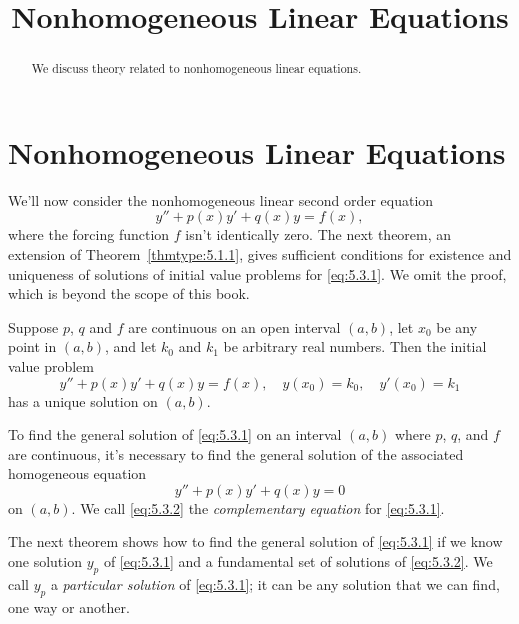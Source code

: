 \documentclass{ximera}
\title{Nonhomogeneous Linear Equations}
\begin{document}
 
\begin{abstract}
 We discuss theory related to nonhomogeneous linear equations.
\end{abstract}
 
\maketitle
 
\section*{Nonhomogeneous Linear Equations}
 
We'll now consider the nonhomogeneous linear second order equation
\begin{equation} \label{eq:5.3.1}
y''+p(x)y'+q(x)y=f(x),
\end{equation}
where the forcing function $f$ isn't  identically zero. The next
theorem, an extension of Theorem~\ref{thmtype:5.1.1}, gives sufficient
conditions for existence and uniqueness of solutions of initial value
problems for \eqref{eq:5.3.1}. We omit the proof, which is beyond the
scope of this book.
 
\begin{theorem}\label{thmtype:5.3.1}
Suppose $p$, $q$ and $f$ are continuous on an open interval
$(a,b)$, let $x_0$ be any point in $(a,b)$, and let $k_0$ and $k_1$ be
arbitrary real numbers. Then the initial value problem
$$
y''+p(x)y'+q(x)y=f(x), \quad  y(x_0)=k_0,\quad y'(x_0)=k_1
$$
 has a unique solution  on $(a,b)$.
\end{theorem}
 
To find the general solution of  \eqref{eq:5.3.1}
on an interval $(a,b)$ where $p$, $q$, and $f$ are continuous,
it's necessary to find the general solution  of
 the associated homogeneous equation
\begin{equation} \label{eq:5.3.2}
y''+p(x)y'+q(x)y=0
\end{equation}
on $(a,b)$. We call \eqref{eq:5.3.2} the \textit{complementary equation}
for \eqref{eq:5.3.1}.
 
The next theorem shows how to find the general solution of
\eqref{eq:5.3.1} if we know one solution $y_p$ of \eqref{eq:5.3.1} and a
fundamental set of solutions of \eqref{eq:5.3.2}. We call
$y_p$ a \textit{particular solution} of \eqref{eq:5.3.1};   it
can be any solution that we can find,  one way or another.
 
\end{document}
